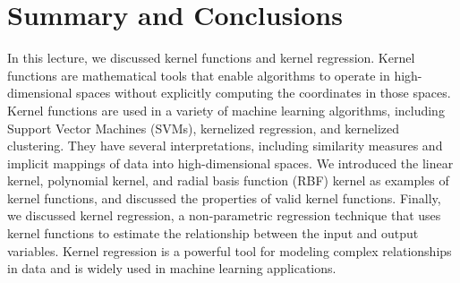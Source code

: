 \documentclass{article}[11pt]
\begin{document}
\section{Summary and Conclusions}
In this lecture, we discussed kernel functions and kernel regression.
Kernel functions are mathematical tools that enable algorithms to operate in high-dimensional spaces without explicitly computing the coordinates in those spaces.
Kernel functions are used in a variety of machine learning algorithms, including Support Vector Machines (SVMs), kernelized regression, and kernelized clustering.
They have several interpretations, including similarity measures and implicit mappings of data into high-dimensional spaces.
We introduced the linear kernel, polynomial kernel, and radial basis function (RBF) kernel as examples of kernel functions, 
and discussed the properties of valid kernel functions.
Finally, we discussed kernel regression, a non-parametric regression technique that uses kernel functions to estimate the relationship between the input and output variables.
Kernel regression is a powerful tool for modeling complex relationships in data and is widely used in machine learning applications.


\end{document}
